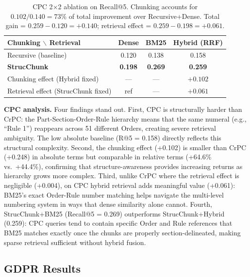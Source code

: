 \documentclass[sn-mathphys,Numbered]{sn-jnl}%
\begin{document}
\begin{table}[htbp]
\centering
\begin{tabular}{lccc}
\toprule
\textbf{Chunking $\backslash$ Retrieval} & \textbf{Dense}
  & \textbf{BM25} & \textbf{Hybrid (RRF)} \\
\midrule
Recursive (baseline)            & 0.120 & 0.138 & 0.158 \\
\textbf{StrucChunk}             & \textbf{0.198} & \textbf{0.269} & \textbf{0.259} \\
\midrule
Chunking effect (Hybrid fixed)  & ---   & ---   & $+0.102$ \\
Retrieval effect (StrucChunk fixed) & ref & ---  & $+0.061$ \\
\bottomrule
\end{tabular}
\caption{CPC 2$\times$2 ablation on Recall@5.  Chunking accounts for
  $0.102/0.140 = 73\%$ of total improvement over Recursive+Dense.
  Total gain = $0.259 - 0.120 = +0.140$;
  retrieval effect = $0.259 - 0.198 = +0.061$.}
\label{tab:cpc_ablation}
\end{table}

\textbf{CPC analysis.}  Four findings stand out.  First, CPC is structurally harder than CrPC: the Part-Section-Order-Rule hierarchy means that the same numeral (e.g., ``Rule 1'') reappears across 51 different Orders, creating severe retrieval ambiguity.  The low absolute baseline (R@5 = 0.158) directly reflects this structural complexity.  Second, the chunking effect (+0.102) is smaller than CrPC (+0.248) in absolute terms but comparable in relative terms (+64.6\% vs.\ +44.4\%), confirming that structure-awareness provides increasing returns as hierarchy grows more complex.  Third, unlike CrPC where the retrieval effect is negligible (+0.004), on CPC hybrid retrieval adds meaningful value (+0.061): BM25's exact Order-Rule number matching helps navigate the multi-level numbering system in ways that dense similarity alone cannot.  Fourth, StrucChunk+BM25 (Recall@5 = 0.269) outperforms StrucChunk+Hybrid (0.259): CPC queries tend to contain specific Order and Rule references that BM25 matches exactly once the chunks are properly section-delineated, making sparse retrieval sufficient without hybrid fusion.

\subsection{GDPR Results}
\end{document}
